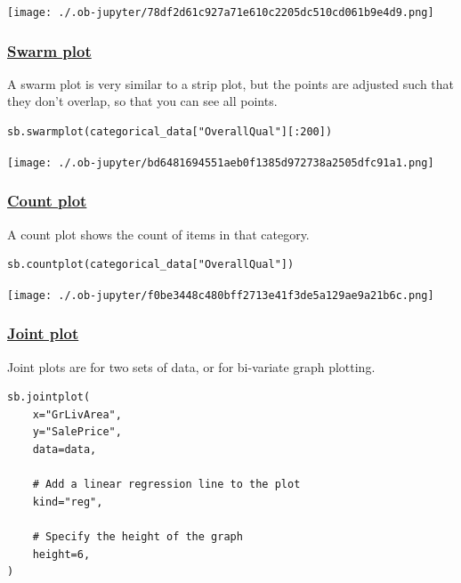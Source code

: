 \documentclass[11pt]{article}
\begin{document}
\begin{center}
\texttt{[image: ./.ob-jupyter/78df2d61c927a71e610c2205dc510cd061b9e4d9.png]}
\label{orgfefad15}
\end{center}

 \newpage
\subsubsection{\href{https://seaborn.pydata.org/generated/seaborn.swarmplot.html}{Swarm plot}}
\label{sec:orgd1f4734}
A swarm plot is very similar to a strip plot, but the points are adjusted such that they don't overlap, so that you can see all points.
\begin{verbatim}
sb.swarmplot(categorical_data["OverallQual"][:200])
\end{verbatim}

\begin{center}
\texttt{[image: ./.ob-jupyter/bd6481694551aeb0f1385d972738a2505dfc91a1.png]}
\label{org876e384}
\end{center}

 \newpage
\subsubsection{\href{https://seaborn.pydata.org/generated/seaborn.countplot.html}{Count plot}}
\label{sec:org4d4df49}
A count plot shows the count of items in that category.
\begin{verbatim}
sb.countplot(categorical_data["OverallQual"])
\end{verbatim}

\begin{center}
\texttt{[image: ./.ob-jupyter/f0be3448c480bff2713e41f3de5a129ae9a21b6c.png]}
\label{org8bd51a5}
\end{center}

 \newpage
\subsubsection{\href{https://seaborn.pydata.org/generated/seaborn.jointplot.html}{Joint plot}}
\label{sec:org97e3bbd}
Joint plots are for two sets of data, or for bi-variate graph plotting.
\begin{verbatim}
sb.jointplot(
    x="GrLivArea",
    y="SalePrice",
    data=data,

    # Add a linear regression line to the plot
    kind="reg",

    # Specify the height of the graph
    height=6,
)
\end{verbatim}
\end{document}
